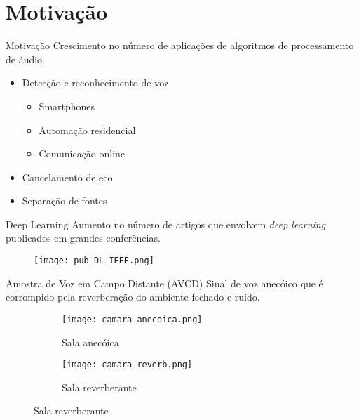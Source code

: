 \section{Motivação}

\begin{frame}{Motivação}
    Crescimento no número de aplicações de algoritmos de processamento de áudio.
    \vspace{0.5cm}

    \begin{itemize}
        \item Detecção e reconhecimento de voz\begin{itemize}
            \item Smartphones
            \item Automação residencial
            \item Comunicação online
        \end{itemize}
        \item Cancelamento de eco 
        \item Separação de fontes
    \end{itemize}
\end{frame}

\begin{frame}{Deep Learning}
    Aumento no número de artigos que envolvem \textit{deep learning} publicados em grandes conferências.
    \vspace{0.5cm}

    \begin{figure} 
        \texttt{[image: pub\_DL\_IEEE.png]}
        \label{fig:pub_DL_IEEE}
    \end{figure}
\end{frame}

\begin{frame}{Amostra de Voz em Campo Distante (AVCD)}
    Sinal de voz anecóico que é corrompido pela reverberação do ambiente fechado e ruído.
    \vspace{0.5cm}

    \begin{figure}
        \begin{subfigure}{.4\textwidth}
            \centering
            \texttt{[image: camara\_anecoica.png]}
            \caption{Sala anecóica}    
        \end{subfigure}
        \begin{subfigure}{.4\textwidth}
            \centering
            \texttt{[image: camara\_reverb.png]}
            \caption{Sala reverberante}    
        \end{subfigure}
        \label{fig:Rooms}
    \end{figure}
\end{frame}

